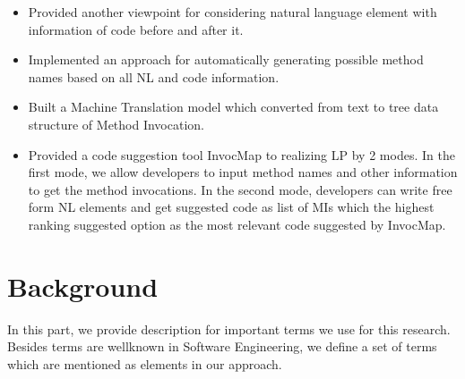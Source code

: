\documentclass[sigconf,review,anonymous]{article}
\begin{document}
\begin{itemize}
	\item Provided another viewpoint for considering natural language element with information of code before and after it. 
	\item Implemented an approach for automatically generating possible method names based on all NL and code information. 
	\item Built a Machine Translation model which converted from text to tree data structure of Method Invocation.
	\item Provided a code suggestion tool InvocMap to realizing LP by 2 modes. In the first mode, we allow developers to input method names and other information to get the method invocations. In the second mode, developers can write free form NL elements and get suggested code as list of MIs which the highest ranking suggested option as the most relevant code suggested by InvocMap.
\end{itemize}

\section{Background}
In this part, we provide description for important terms we use for this research. Besides terms are wellknown in Software Engineering, we define a set of terms which are mentioned as elements in our approach.
\end{document}
